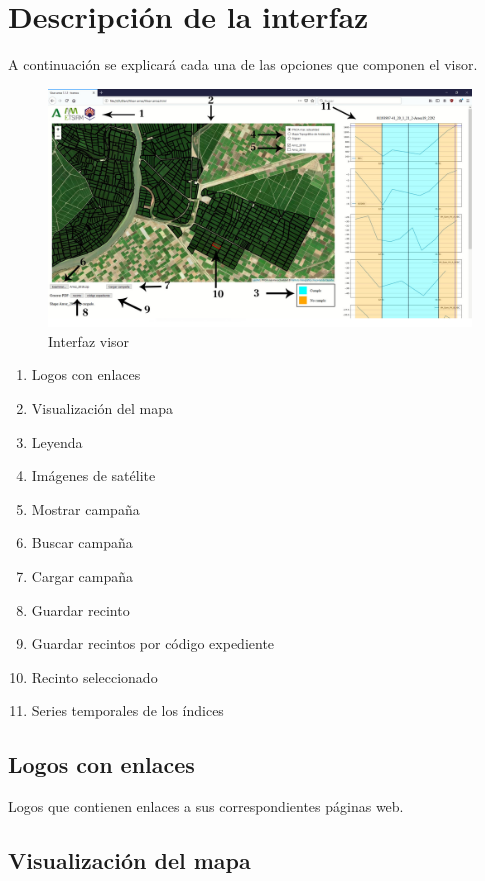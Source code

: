 \documentclass{article}
\begin{document}
\newpage

\section{Descripción de la interfaz}

A continuación se explicará cada una de las opciones que componen el visor.

\begin{figure}[H]
	\centering
	\includegraphics[width=0.8\linewidth]{image_interface.jpg}
	\caption{Interfaz visor}
	\label{fig:image-interfaz}
\end{figure}

\begin{enumerate}
	\item Logos con enlaces
	\item Visualización del mapa
	\item Leyenda
	\item Imágenes de satélite
	\item Mostrar campaña
	\item Buscar campaña
	\item Cargar campaña
	\item Guardar recinto
	\item Guardar recintos por código expediente
	\item Recinto seleccionado
	\item Series temporales de los índices
\end{enumerate}

\newpage

\subsection{Logos con enlaces}

Logos que contienen enlaces a sus correspondientes páginas web.

\subsection{Visualización del mapa}
\end{document}
